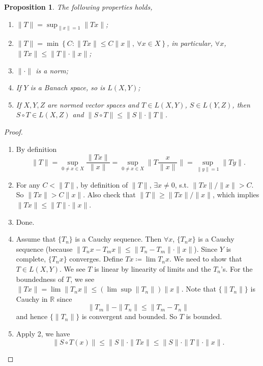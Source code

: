 \documentclass[12pt]{article}
\theoremstyle{plain}
\newtheorem*{prop}{Proposition}
\theoremstyle{definition}
\begin{document}
\begin{prop} The following properties holds,
    \begin{enumerate}
        \item $\|T\| = \sup_{\|x\|=1} \|Tx\|$;
        \item $\|T\| = \min\left\{ C:\|Tx\|\leq C\|x\|,\ \forall x\in X\right\}$, in particular, $\forall x$,
            $\|Tx\|\leq \|T\|\cdot\|x\|$;
        \item $\|\cdot\|$ is a norm;
        \item If $Y$ is a Banach space, so is $L(X,Y)$;
        \item If $X, Y, Z$ are normed vector spaces and $T\in L(X,Y)$, $S\in L(Y,Z)$, then $S\circ T\in L(X,Z)$ and
            $\|S\circ T\| \leq \|S\|\cdot \|T\|$.
    \end{enumerate}
\end{prop}
\begin{proof}
    \begin{enumerate}
        \item By definition
            \[
                \|T\| = \sup_{0\neq x\in X}\frac{\|Tx\|}{\|x\|} = \sup_{0\neq x\in X}\|T\frac{x}{\|x\|}\| =
                \sup_{\|y\|=1}\|Ty\|.
            \]
        \item 
            For any $C<\|T\|$, by definition of $\|T\|$, $\exists x\neq 0$, s.t. $\|Tx\|/\|x\| > C$.
            So $\|Tx\| > C\|x\|$.
            Also check that $\|T\|\geq \|Tx\|/\|x\|$, which implies $\|Tx\|\leq \|T\|\cdot\|x\|$.
        \item Done.
        \item Assume that $\{T_n\}$ is a Cauchy sequence.
            Then $\forall x$, $\{T_nx\}$ is a Cauchy sequence (because $\|T_n x - T_m x\| \leq \|T_n - T_m\|\cdot
            \|x\|$).
            Since $Y$ is complete, $\{T_nx\}$ converges.
            Define $Tx\coloneqq \lim T_nx$.
            We need to show that $T\in L(X,Y)$.
            We see $T$ is linear by linearity of limits and the $T_n$'s.
            For the boundedness of $T$,
            we see $\|Tx\| = \lim \|T_n x\| \leq (\lim\sup \|T_n\|)\|x\|$.
            Note that $\{\|T_n\|\}$ is Cauchy in $\mathbb{R}$ since
            \[
                \|T_m\| - \|T_n\| \leq \|T_m-T_n\|
            \]
            and hence $\{\|T_n\|\}$ is convergent and bounded.
            So $T$ is bounded.
        \item
            Apply 2, we have
            \[
                \|S\circ T(x)\| \leq \|S\|\cdot \|Tx\| \leq \|S\|\cdot \|T\|\cdot \|x\|.
            \]
    \end{enumerate}
\end{proof}
\end{document}
